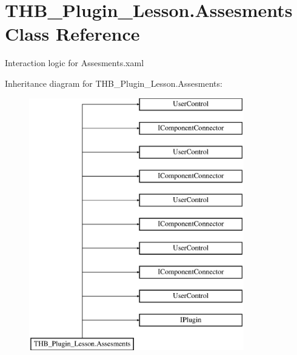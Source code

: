 \hypertarget{class_t_h_b___plugin___lesson_1_1_assesments}{}\section{T\+H\+B\+\_\+\+Plugin\+\_\+\+Lesson.\+Assesments Class Reference}
\label{class_t_h_b___plugin___lesson_1_1_assesments}


Interaction logic for Assesments.\+xaml  


Inheritance diagram for T\+H\+B\+\_\+\+Plugin\+\_\+\+Lesson.\+Assesments\+:\begin{figure}[H]
\begin{center}
\leavevmode
\includegraphics[height=11.000000cm]{d7/dc2/class_t_h_b___plugin___lesson_1_1_assesments}
\end{center}
\end{figure}
